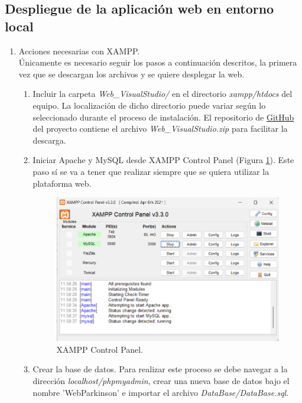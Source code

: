 \subsection{Despliegue de la aplicación web en entorno local}
\begin{enumerate}
    \item Acciones necesarias con XAMPP.\\
    Únicamente es necesario seguir los pasos a continuación descritos, la primera vez que se descargan los archivos y se quiere desplegar la web.
    \begin{enumerate}
        \item Incluir la carpeta \textit{Web\_VisualStudio/} en el directorio \textit{xampp/htdocs} del equipo. La localización de dicho directorio puede variar según lo seleccionado durante el proceso de instalación. El repositorio de \href{https://github.com/imb1006/Web_Seguimiento_Parkinson}{GitHub} del proyecto contiene el archivo \textit{Web\_VisualStudio.zip} para facilitar la descarga.
        
        \item Iniciar Apache y MySQL desde XAMPP Control Panel (Figura \ref{fig:xampp}). Este paso sí se va a tener que realizar siempre que se quiera utilizar la plataforma web.
            \begin{figure}[h]
                \centering
                \includegraphics[width=1\textwidth]{img/B2_InstalacionPuestaMarcha/xampp.png}
                \caption{XAMPP Control Panel.}
                \label{fig:xampp}
            \end{figure}
            
        \item Crear la base de datos. Para realizar este proceso se debe navegar a la dirección \textit{localhost/phpmyadmin}, crear una nueva base de datos bajo el nombre 'WebParkinson' e importar el archivo \textit{DataBase/DataBase.sql}.
    \end{enumerate}
    

\end{enumerate}
